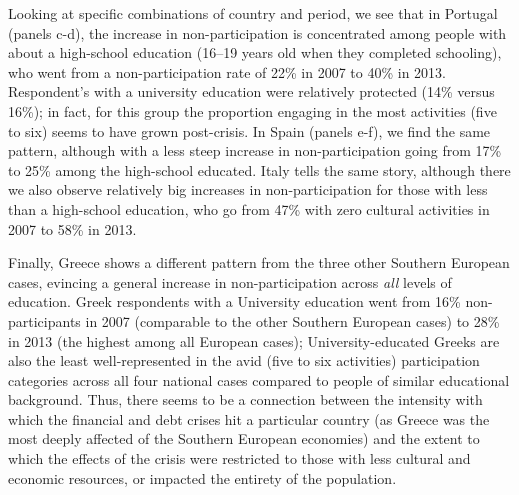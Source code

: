\documentclass{article}
\begin{document}
Looking at specific combinations of country and period, we see that in Portugal (panels c-d), the increase in non-participation is concentrated among people with about a high-school education (16–19 years old when they completed schooling), who went from a non-participation rate of 22\% in 2007 to 40\% in 2013. Respondent's with a university education were relatively protected (14\% versus 16\%); in fact, for this group the proportion engaging in the most activities (five to six) seems to have grown post-crisis. In Spain (panels e-f), we find the same pattern, although with a less steep increase in non-participation going from 17\% to 25\% among the high-school educated. Italy tells the same story, although there we also observe relatively big increases in non-participation for those with less than a high-school education, who go from 47\% with zero cultural activities in 2007 to 58\% in 2013. 

Finally, Greece shows a different pattern from the three other Southern European cases, evincing a general increase in non-participation across {\em all} levels of education. Greek respondents with a University education went from 16\% non-participants in 2007 (comparable to the other Southern European cases) to 28\% in 2013 (the highest among all European cases); University-educated Greeks are also the least well-represented in the avid (five to six activities) participation categories across all four national cases compared to people of similar educational background. Thus, there seems to be a connection between the intensity with which the financial and debt crises hit a particular country (as Greece was the most deeply affected of the Southern European economies) and the extent to which the effects of the crisis were restricted to those with less cultural and economic resources, or impacted the entirety of the population. 
\end{document}
